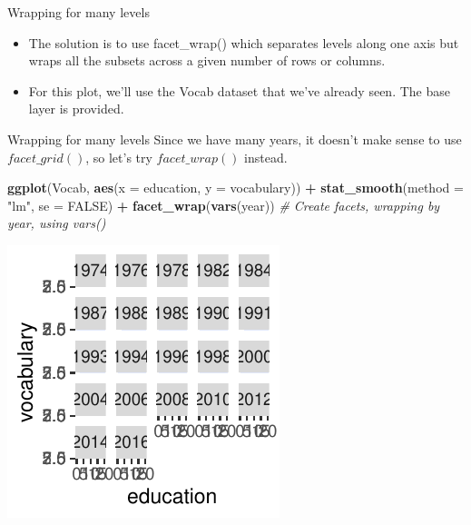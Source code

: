 \documentclass[
  ignorenonframetext,
]{beamer}
\newenvironment{Shaded}{\begin{snugshade}}{\end{snugshade}}
\newcommand{\AttributeTok}[1]{\textcolor[rgb]{0.13,0.29,0.53}{#1}}
\newcommand{\CommentTok}[1]{\textcolor[rgb]{0.56,0.35,0.01}{\textit{#1}}}
\newcommand{\ConstantTok}[1]{\textcolor[rgb]{0.56,0.35,0.01}{#1}}
\newcommand{\FunctionTok}[1]{\textcolor[rgb]{0.13,0.29,0.53}{\textbf{#1}}}
\newcommand{\NormalTok}[1]{#1}
\newcommand{\SpecialCharTok}[1]{\textcolor[rgb]{0.81,0.36,0.00}{\textbf{#1}}}
\newcommand{\StringTok}[1]{\textcolor[rgb]{0.31,0.60,0.02}{#1}}
\begin{document}
\begin{frame}{Wrapping for many levels}
\label{wrapping-for-many-levels-1}
\begin{itemize}
\item
  The solution is to use facet\_wrap() which separates levels along one
  axis but wraps all the subsets across a given number of rows or
  columns.
\item
  For this plot, we'll use the Vocab dataset that we've already seen.
  The base layer is provided.
\end{itemize}
\end{frame}

\begin{frame}[fragile]{Wrapping for many levels}
\label{wrapping-for-many-levels-2}
Since we have many years, it doesn't make sense to use
\(facet\_grid()\), so let's try \(facet\_wrap()\) instead.

\begin{Shaded}
\begin{Highlighting}[]
\FunctionTok{ggplot}\NormalTok{(Vocab, }\FunctionTok{aes}\NormalTok{(}\AttributeTok{x =}\NormalTok{ education, }\AttributeTok{y =}\NormalTok{ vocabulary)) }\SpecialCharTok{+} \FunctionTok{stat\_smooth}\NormalTok{(}\AttributeTok{method =} \StringTok{"lm"}\NormalTok{,}
    \AttributeTok{se =} \ConstantTok{FALSE}\NormalTok{) }\SpecialCharTok{+} \FunctionTok{facet\_wrap}\NormalTok{(}\FunctionTok{vars}\NormalTok{(year))  }\CommentTok{\# Create facets, wrapping by year, using vars()}
\end{Highlighting}
\end{Shaded}

\begin{center}\includegraphics[width=0.5\linewidth]{Figs/unnamed-chunk-93-1} \end{center}
\end{frame}
\end{document}
